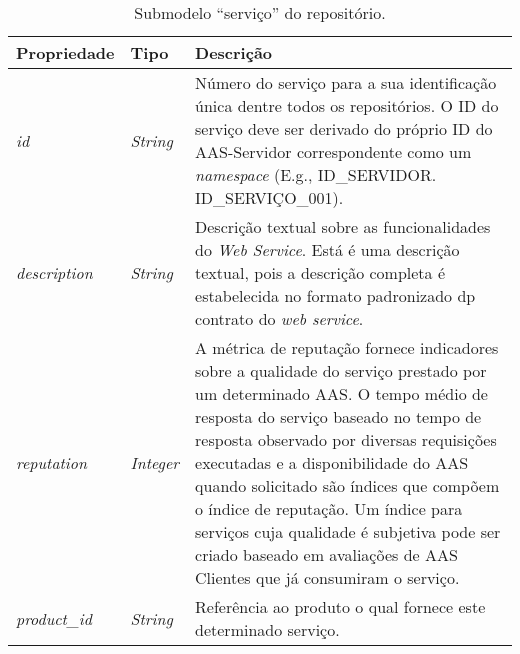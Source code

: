 \begin{table}[htb]
	\centering
	\caption{Submodelo ``serviço'' do repositório.}
	\begin{tabular}{p{2.5cm}p{1.5cm}p{9.5cm}}
		\hline
		\textbf{Propriedade}
		 & \textbf{Tipo}
		 & \textbf{Descrição}                                                                                                                                                                                                                                                                                                                                                                                                                                         \\

		\hline
		\textit{id}
		 & \textit{String}
		 & Número do serviço para a sua identificação única dentre todos os repositórios. O ID do serviço deve ser derivado do próprio ID do AAS-Servidor correspondente como um \textit{namespace} (E.g., ID\_SERVIDOR. ID\_SERVIÇO\_001).                                                                                                                                                                                                                           \\

		\hline
		\textit{description}
		 & \textit{String}
		 & Descrição textual sobre as funcionalidades do \textit{Web Service}. Está é uma descrição textual, pois a descrição completa é estabelecida no formato padronizado dp contrato do \textit{web service}.                                                                                                                                                                                                                                                     \\

		\hline
		\textit{reputation}
		 & \textit{Integer}
		 & A métrica de reputação fornece indicadores sobre a qualidade do serviço prestado por um determinado AAS. O tempo médio de resposta do serviço baseado no tempo de resposta observado por diversas requisições executadas e a disponibilidade do AAS quando solicitado são índices que compõem o índice de reputação. Um índice para serviços cuja qualidade é subjetiva pode ser criado baseado em avaliações de AAS Clientes que já consumiram o serviço. \\

		\hline
		\textit{product\_id}
		 & \textit{String}
		 & Referência ao produto o qual fornece este determinado serviço.                                                                                                                                                                                                                                                                                                                                                                                             \\

		\hline
	\end{tabular}
	\label{tab:repositorio-submodelo-servico}
\end{table}

